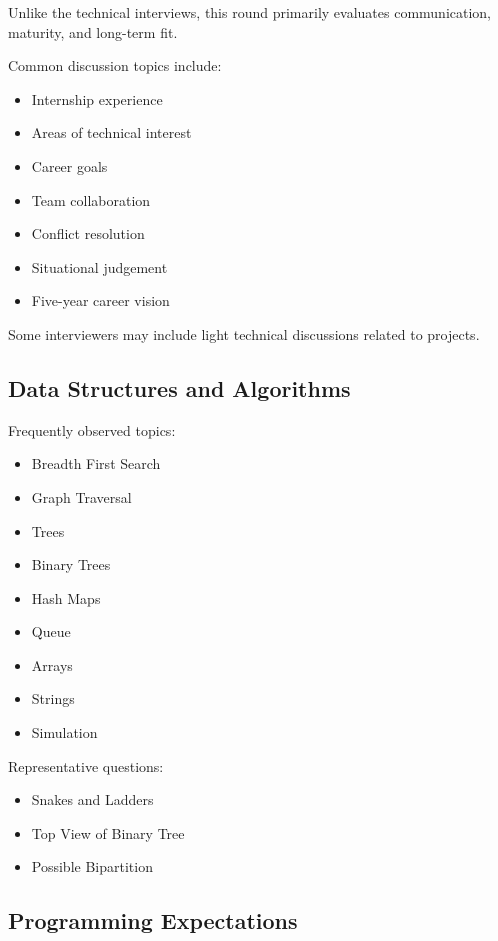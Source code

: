 \documentclass[11pt,a4paper]{article}
\begin{document}
Unlike the technical interviews, this round primarily evaluates communication, maturity, and long-term fit.

Common discussion topics include:

\begin{itemize}
	\item Internship experience
	\item Areas of technical interest
	\item Career goals
	\item Team collaboration
	\item Conflict resolution
	\item Situational judgement
	\item Five-year career vision
\end{itemize}

Some interviewers may include light technical discussions related to projects.


\subsection{Data Structures and Algorithms}

Frequently observed topics:

\begin{itemize}
	\item Breadth First Search
	\item Graph Traversal
	\item Trees
	\item Binary Trees
	\item Hash Maps
	\item Queue
	\item Arrays
	\item Strings
	\item Simulation
\end{itemize}

Representative questions:

\begin{itemize}
	\item Snakes and Ladders
	\item Top View of Binary Tree
	\item Possible Bipartition
\end{itemize}


\subsection{Programming Expectations}
\end{document}
